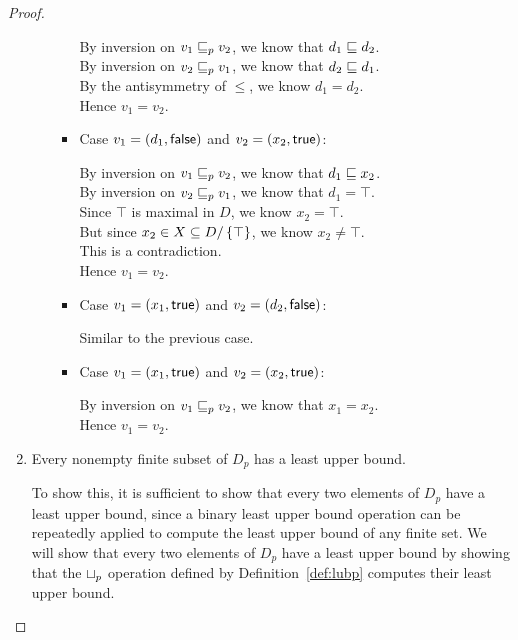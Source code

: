 \begin{proof}
\begin{enumerate}
\begin{enumerate}
\begin{itemize}
    By inversion on $v_1 \sqsubseteq_p v_2$, we know that $d_1 \sqsubseteq d_2$. \\ 
    By inversion on $v_2 \sqsubseteq_p v_1$, we know that $d_2 \sqsubseteq d_1$. \\ 
    By the antisymmetry of $\leq$, we know $d_1 = d_2$. \\ 
    Hence $v_1 = v_2$. 

  \item Case $v_1 = (d_1, \textsf{false})$ and $v_2 = (x_2, \textsf{true})$: 

    By inversion on $v_1 \sqsubseteq_p v_2$, we know that $d_1 \sqsubseteq x_2$. \\ 
    By inversion on $v_2 \sqsubseteq_p v_1$, we know that $d_1 = \top$. \\ 
    Since $\top$ is maximal in $D$, we know $x_2 = \top$. \\ 
    But since $x_2 \in X \subseteq D/\left\{\top\right\}$, we know $x_2 \not= \top$. \\ 
    This is a contradiction. \\
    Hence $v_1 = v_2$. 
    
  \item Case $v_1 = (x_1, \textsf{true})$ and $v_2 = (d_2, \textsf{false})$: 

    Similar to the previous case. 

  \item Case $v_1 = (x_1, \textsf{true})$ and $v_2 = (x_2, \textsf{true})$: 

    By inversion on $v_1 \sqsubseteq_p v_2$, we know that $x_1 = x_2$. \\
    Hence $v_1 = v_2$. 
  \end{itemize}
\end{enumerate}

\item Every nonempty finite subset of $D_p$ has a least upper bound.

To show this, it is sufficient to show that every two elements of
$D_p$ have a least upper bound, since a binary least upper bound
operation can be repeatedly applied to compute the least upper bound
of any finite set.  We will show that every two elements of $D_p$ have
a least upper bound by showing that the $ \sqcup_p $ operation defined
by Definition~\ref{def:lubp} computes their least upper bound.



\end{enumerate}
\end{proof}
